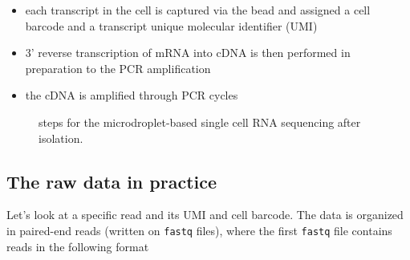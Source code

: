 \documentclass[
  letterpaper,
  DIV=11,
  numbers=noendperiod]{scrartcl}
\providecommand{\tightlist}{%
  \setlength{\itemsep}{0pt}\setlength{\parskip}{0pt}}\usepackage{longtable,booktabs,array}
\begin{document}
\begin{itemize}
\tightlist
\item
  each transcript in the cell is captured via the bead and assigned a
  cell barcode and a transcript unique molecular identifier (UMI)
\item
  3' reverse transcription of mRNA into cDNA is then performed in
  preparation to the PCR amplification
\item
  the cDNA is amplified through PCR cycles
\end{itemize}

\begin{figure}


\caption{\label{fig-steps}steps for the microdroplet-based single cell
RNA sequencing after isolation.}

\end{figure}%

\subsection{The raw data in practice}\label{the-raw-data-in-practice}

Let's look at a specific read and its UMI and cell barcode. The data is
organized in paired-end reads (written on \texttt{fastq} files), where
the first \texttt{fastq} file contains reads in the following format
\end{document}
